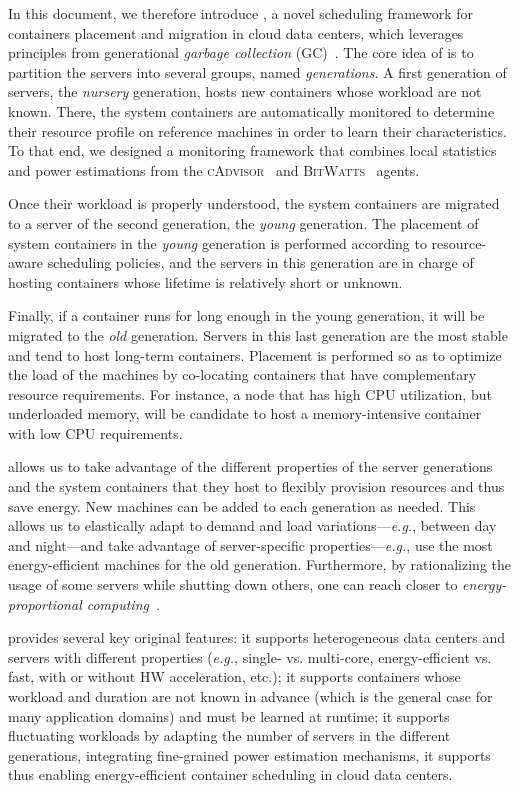 In this document, we therefore introduce \GP, a novel scheduling framework for containers placement and migration in cloud data centers, which leverages principles from generational \emph{garbage collection} (GC)~\cite{Ungar:1984:GSN:390011.808261,Lieberman:1983:RGC:358141.358147}.
The core idea of \GP is to partition the servers into several groups, named \emph{generations}.
A first generation of servers, the \emph{nursery} generation, hosts new containers whose workload are not known.
There, the system containers are automatically monitored to determine their resource profile on reference machines in order to learn their characteristics.
To that end, we designed a monitoring framework that combines local statistics and power estimations from the \textsc{cAdvisor}~\cite{cAdvisor} and \textsc{BitWatts}~\cite{DBLP:conf/eurosys/ColmantKFHRS15} agents.

Once their workload is properly understood, the system containers are migrated to a server of the second generation, the \emph{young} generation.
The placement of system containers in the \emph{young} generation is performed according to resource-aware scheduling policies, and the servers in this generation are in charge of hosting containers whose lifetime is relatively short or unknown.

Finally, if a container runs for long enough in the young generation, it will be migrated to the \emph{old} generation.
Servers in this last generation are the most stable and tend to host long-term containers.
Placement is performed so as to optimize the load of the machines by co-locating containers that have complementary resource requirements.
For instance, a node that has high CPU utilization, but underloaded memory, will be candidate to host a memory-intensive container with low CPU requirements.

\GP allows us to take advantage of the different properties of the server generations and the system containers that they host to flexibly provision resources and thus save energy.
New machines can be added to each generation as needed.
This allows us to elastically adapt to demand and load variations---\emph{e.g.}, between day and night---and take advantage of server-specific properties---\emph{e.g.}, use the most energy-efficient machines for the old generation.
Furthermore, by rationalizing the usage of some servers while shutting down others, one can reach closer to \emph{energy-proportional computing}~\cite{Barroso:2007:Energy:Proportional:Computing}.

\GP provides several key original features: it supports heterogeneous data centers and servers with different properties (\emph{e.g.}, single- vs. multi-core, energy-efficient vs. fast, with or without HW acceleration, etc.); it supports containers whose workload and duration are not known in advance (which is the general case for many application domains) and must be learned at runtime; it supports fluctuating workloads by adapting the number of servers in the different generations, integrating fine-grained power estimation mechanisms, it supports thus enabling energy-efficient container scheduling in cloud data centers.

